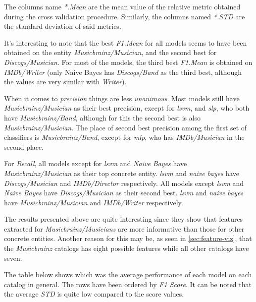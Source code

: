 \documentclass[epsfig,a4paper,11pt,titlepage,twoside,openany]{book}
\begin{document}
The columns name \textit{*.Mean} are the mean value of the relative metric obtained during the cross validation procedure. Similarly, the columns named \textit{*.STD} are the standard deviation of said metrics. 

It's interesting to note that the best \textit{F1.Mean} for all models seems to have been obtained on the entity \textit{Musicbrainz/Musician}, and the second best for \textit{Discogs/Musician}. For most of the models, the third best \textit{F1.Mean} is obtained on \textit{IMDb/Writer} (only Naive Bayes has \textit{Discogs/Band} as the third best, although the values are very similar with \textit{Writer}).

When it comes to \textit{precision} things are less \textit{unanimous}. Most models still have \textit{Musicbrainz/Musician} as their best precision, except for \textit{lsvm}, and \textit{slp}, who both have \textit{Musicbrainz/Band}, although for this the second best is also \textit{Musicbrainz/Musician}. The place of second best precision among the first set of classifiers is \textit{Musicbrainz/Band}, except for \textit{mlp}, who has \textit{IMDb/Musician} in the second place. 

For \textit{Recall}, all models except for \textit{lsvm} and \textit{Naive Bayes} have \textit{Musicbrainz/Musician} as their top concrete entity. \textit{lsvm} and \textit{naive bayes} have \textit{Discogs/Musician} and \textit{IMDb/Director} respectively. All models except \textit{lsvm} and \textit{Naive Bayes} have \textit{Discogs/Musician} as their second best. \textit{lsvm} and \textit{naive bayes} have \textit{Musicbrainz/Musician} and \textit{IMDb/Writer} respectively.

The results presented above are quite interesting since they show that features extracted for \textit{Musicbrainz/Musicians} are more informative than those for other concrete entities. Another reason for this may be, as seen in \autoref{sec:feature-viz}, that the \textit{Musicbrainz} catalogs has eight possible features while all other catalogs have seven. 

The table below shows which was the average performance of each model on each catalog in general. The rows have been ordered by \textit{F1 Score}. It can be noted that the average \textit{STD} is quite low compared to the score values. 
\end{document}

